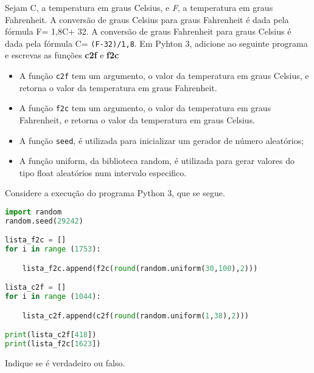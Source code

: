 \documentclass[12pt,varwidth=16cm,border=17pt]{standalone}
\begin{document}
Sejam C, a temperatura em graus Celsius, e \emph{F}, a temperatura em graus Fahrenheit. A conversão de graus Celsius para graus Fahrenheit é dada pela fórmula F= 1,8C+ 32. A conversão de graus Fahrenheit para graus Celsius é dada pela fórmula C= \verb+(F-32)/1,8+.
Em Pyhton 3, adicione ao seguinte programa e escrevas as funções \textbf{c2f} e \textbf{f2c} 


\begin{itemize}
    
  \item A função \verb+c2f+ tem um argumento, o valor da temperatura em graus Celsius, e retorna o valor da temperatura em graus Fahrenheit.
  
  \item  A função \verb+f2c+ tem um argumento, o valor da temperatura em graus Fahrenheit, e retorna o valor da temperatura em graus Celsius.

  \item A função \verb+seed+, é utilizada para inicializar um gerador de número aleatórios;
  
  \item A função uniform, da biblioteca random, é utilizada para gerar valores do tipo float aleatórios num intervalo especifico.

    
\end{itemize}




Considere a execução do programa Python 3, que se segue. 

\begin{lstlisting}[language=Python]
import random
random.seed(29242)

lista_f2c = []
for i in range (1753):

    lista_f2c.append(f2c(round(random.uniform(30,100),2)))

lista_c2f = []
for i in range (1044):

    lista_c2f.append(c2f(round(random.uniform(1,38),2)))

print(lista_c2f[418])
print(lista_f2c[1623])
\end{lstlisting}

Indique se é verdadeiro ou falso.
\end{document}
